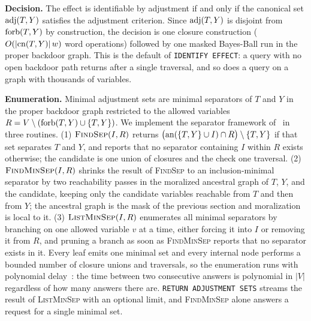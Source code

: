 \noindent\textbf{Decision.} The effect is identifiable by adjustment if and
only if the canonical set $\mathrm{adj}(T,Y)$ satisfies the adjustment criterion.
Since $\mathrm{adj}(T,Y)$ is disjoint from $\mathrm{forb}(T,Y)$ by construction, the decision
is one closure construction ($O(|\mathrm{cn}(T,Y)|\,w)$ word operations) followed by
one masked Bayes-Ball run in the proper backdoor graph. This is the default of
\lstinline[style=causaldsl]|IDENTIFY EFFECT|: a query with no open backdoor
path returns after a single traversal, and so does a query on a graph with
thousands of variables.

\noindent\textbf{Enumeration.} Minimal adjustment sets are minimal separators
of $T$ and $Y$ in the proper backdoor graph restricted to the allowed
variables $R = V \setminus (\mathrm{forb}(T,Y) \cup \{T,Y\})$. We implement the
separator framework of~\cite{vanderzander2019separators} in three routines.
(1) $\textsc{FindSep}(I,R)$ returns $\bigl(\mathrm{an}(\{T,Y\} \cup I) \cap R\bigr)
\setminus \{T,Y\}$ if that set separates $T$ and $Y$, and reports that no
separator containing $I$ within $R$ exists otherwise; the candidate is one
union of closures and the check one traversal.
(2) $\textsc{FindMinSep}(I,R)$ shrinks the result of \textsc{FindSep} to an
inclusion-minimal separator by two reachability passes in the moralized
ancestral graph of $T$, $Y$, and the candidate, keeping only the candidate
variables reachable from $T$ and then from $Y$; the ancestral graph is the
mask of the previous section and moralization is local to it.
(3) $\textsc{ListMinSep}(I,R)$ enumerates all minimal separators by
branching on one allowed variable $v$ at a time, either forcing it into $I$
or removing it from $R$, and pruning a branch as soon as \textsc{FindMinSep}
reports that no separator exists in it. Every leaf emits one minimal set and
every internal node performs a bounded number of closure unions and
traversals, so the enumeration runs with polynomial
delay~\cite{vanderzander2019separators}: the time between two consecutive
answers is polynomial in $|V|$ regardless of how many answers there are.
\lstinline[style=causaldsl]|RETURN ADJUSTMENT SETS| streams the result of
\textsc{ListMinSep} with an optional limit, and \textsc{FindMinSep} alone
answers a request for a single minimal set.

